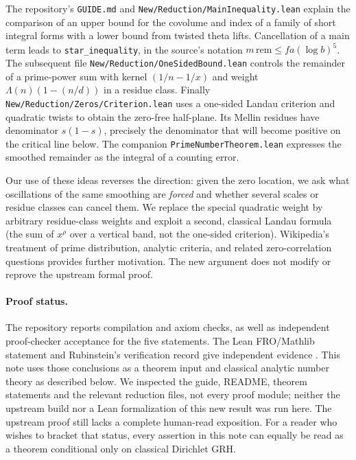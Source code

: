\documentclass[11pt]{article}
\theoremstyle{remark}\newtheorem{remark}[theorem]{Remark}
\begin{document}
The repository's \texttt{GUIDE.md} and \texttt{New/Reduction/MainInequality.lean} explain the comparison of an upper bound for the covolume and index of a family of short integral forms with a lower bound from twisted theta lifts. Cancellation of a main term leads to \texttt{star\_inequality}, in the source's notation $m\,\mathrm{rem}\le fa(\log b)^5$. The subsequent file \texttt{New/Reduction/OneSidedBound.lean} controls the remainder of a prime-power sum with kernel $(1/n-1/x)$ and weight $\Lambda(n)(1-(n/d))$ in a residue class. Finally \texttt{New/Reduction/Zeros/Criterion.lean} uses a one-sided Landau criterion and quadratic twists to obtain the zero-free half-plane. Its Mellin residues have denominator $s(1-s)$, precisely the denominator that will become positive on the critical line below. The companion \texttt{PrimeNumberTheorem.lean} expresses the smoothed remainder as the integral of a counting error.

Our use of these ideas reverses the direction: given the zero location, we ask what oscillations of the same smoothing are \emph{forced} and whether several scales or residue classes can cancel them. We replace the special quadratic weight by arbitrary residue-class weights and exploit a second, classical Landau formula (the sum of $x^\rho$ over a vertical band, not the one-sided criterion). Wikipedia's treatment of prime distribution, analytic criteria, and related zero-correlation questions \cite{wiki} provides further motivation. The new argument does not modify or reprove the upstream formal proof.

\paragraph{Proof status.} The repository reports compilation and axiom checks, as well as independent proof-checker acceptance for the five statements. The Lean FRO/Mathlib statement and Rubinstein's verification record give independent evidence \cite{lean,waterloo}. This note uses those conclusions as a theorem input and classical analytic number theory as described below. We inspected the guide, README, theorem statements and the relevant reduction files, not every proof module; neither the upstream build nor a Lean formalization of this new result was run here. The upstream proof still lacks a complete human-read exposition. For a reader who wishes to bracket that status, every assertion in this note can equally be read as a theorem conditional only on classical Dirichlet GRH.
\end{document}
